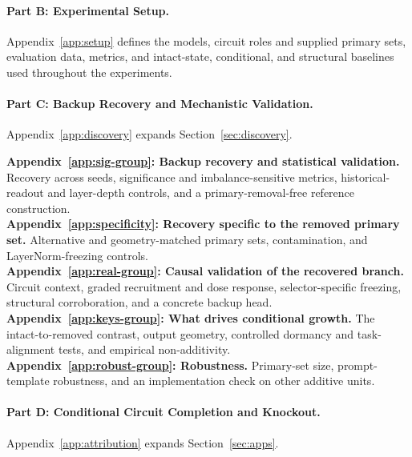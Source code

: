\vspace{1mm}
\paragraph{Part B: Experimental Setup.}
Appendix~\ref{app:setup} defines the models, circuit roles and supplied primary sets, evaluation data, metrics, and intact-state, conditional, and structural baselines used throughout the experiments.

\vspace{1mm}
\paragraph{Part C: Backup Recovery and Mechanistic Validation.}
Appendix~\ref{app:discovery} expands Section~\ref{sec:discovery}.
\vspace{-1mm}

\noindent\textbf{Appendix~\ref{app:sig-group}: Backup recovery and statistical validation.}
Recovery across seeds, significance and imbalance-sensitive metrics, historical-readout and layer-depth controls, and a primary-removal-free reference construction.\\
\noindent\textbf{Appendix~\ref{app:specificity}: Recovery specific to the removed primary set.}
Alternative and geometry-matched primary sets, contamination, and LayerNorm-freezing controls.\\
\noindent\textbf{Appendix~\ref{app:real-group}: Causal validation of the recovered branch.}
Circuit context, graded recruitment and dose response, selector-specific freezing, structural corroboration, and a concrete backup head.\\
\noindent\textbf{Appendix~\ref{app:keys-group}: What drives conditional growth.}
The intact-to-removed contrast, output geometry, controlled dormancy and task-alignment tests, and empirical non-additivity.\\
\noindent\textbf{Appendix~\ref{app:robust-group}: Robustness.}
Primary-set size, prompt-template robustness, and an implementation check on other additive units.

\vspace{1mm}
\paragraph{Part D: Conditional Circuit Completion and Knockout.}
Appendix~\ref{app:attribution} expands Section~\ref{sec:apps}.
\vspace{-1mm}

